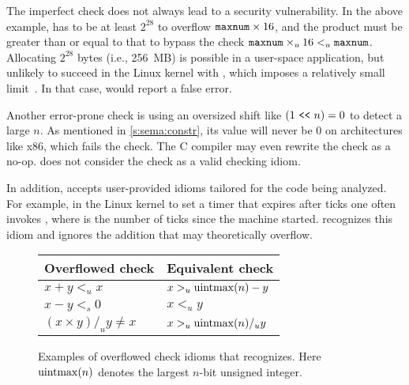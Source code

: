 The imperfect check does not always lead to a security vulnerability.
In the above example,  has to be at least $2^{28}$ to
overflow $\texttt{maxnum} \times 16$, and the product must be greater
than or equal to that to bypass the check $\texttt{maxnum} \times_u 16
<_u \texttt{maxnum}$.  Allocating $2^{28}$ bytes (i.e., 256~MB) is
possible in a user-space application, but unlikely to succeed in
the Linux kernel with , which imposes a relatively small
limit~\cite[\chapterautorefname~8]{ldd3}.  In that case, \sys
would report a false error.

Another error-prone check is using an oversized shift like $(1 \ \texttt{<}\texttt{<}\ 
n) = 0$ to detect a large $n$.  As mentioned in \autoref{s:sema:constr},
its value will never be 0 on architectures like x86, which fails
the check.  The C compiler may even rewrite the check as a no-op.
\sys does not consider the check as a valid checking idiom.

In addition, \sys accepts user-provided idioms tailored for the
code being analyzed.  For example, in the Linux kernel to set a
timer that expires after  ticks one often invokes
, where  is the
number of ticks since the machine started.  \sys recognizes
this idiom and ignores the addition  that may
theoretically overflow.

\begin{figure}
\centering
\begin{tabular}{ll}
\toprule
Overflowed check & Equivalent check \\ \midrule
$x + y <_u x$ & $x >_u \operatorname{uintmax}(n) - y$ \\
$x - y <_s 0$ & $x <_u y$ \\
$(x \times y) /_u y \neq x$ & $x >_u \operatorname{uintmax}(n) /_u y$   \\
\bottomrule
\end{tabular}
\caption{Examples of overflowed check idioms that \sys recognizes.
Here $\operatorname{uintmax}(n)$ denotes the largest $n$-bit unsigned integer.}
\label{f:whitelist}
\end{figure}
